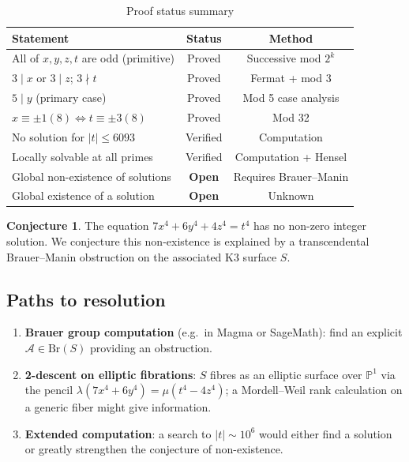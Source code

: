 \documentclass[12pt, a4paper]{article}
\theoremstyle{definition}
\newtheorem{conjecture}[theorem]{Conjecture}
\begin{document}
\begin{table}[h]
\centering
\caption{Proof status summary}
\begin{tabular}{lcc}
\toprule
Statement & Status & Method \\
\midrule
All of $x,y,z,t$ are odd (primitive) & Proved & Successive mod $2^k$ \\
$3 \mid x$ or $3 \mid z$; $3 \nmid t$ & Proved & Fermat + mod 3 \\
$5 \mid y$ (primary case) & Proved & Mod 5 case analysis \\
$x \equiv \pm1(8) \Leftrightarrow t \equiv \pm3(8)$ & Proved & Mod 32 \\
No solution for $|t| \leq 6093$ & Verified & Computation \\
Locally solvable at all primes & Verified & Computation + Hensel \\
\midrule
Global non-existence of solutions & \textbf{Open} & Requires Brauer–Manin \\
Global existence of a solution & \textbf{Open} & Unknown \\
\bottomrule
\end{tabular}
\end{table}

\begin{conjecture}
  The equation $7x^4 + 6y^4 + 4z^4 = t^4$ has no non-zero integer solution.
  We conjecture this non-existence is explained by a transcendental Brauer--Manin
  obstruction on the associated K3 surface $S$.
\end{conjecture}

\subsection*{Paths to resolution}

\begin{enumerate}
  \item \textbf{Brauer group computation} (e.g.\ in Magma or SageMath):
        find an explicit $\mathcal{A} \in \mathrm{Br}(S)$ providing an obstruction.
  \item \textbf{2-descent on elliptic fibrations}: $S$ fibres as an elliptic surface
        over $\mathbb{P}^1$ via the pencil $\lambda(7x^4+6y^4) = \mu(t^4-4z^4)$;
        a Mordell--Weil rank calculation on a generic fiber might give information.
  \item \textbf{Extended computation}: a search to $|t| \sim 10^6$ would either
        find a solution or greatly strengthen the conjecture of non-existence.
\end{enumerate}
\end{document}

